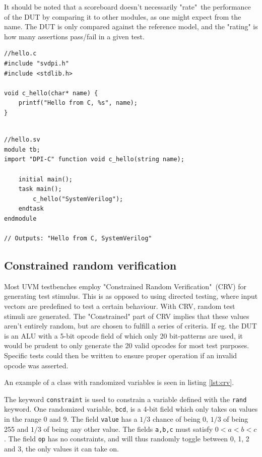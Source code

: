 \documentclass[conference]{IEEEtran}
\newcommand{\SV}{SystemVerilog\xspace}
\begin{document}
It should be noted that a scoreboard doesn't necessarily "rate"\, the performance of the DUT by comparing it to other modules, as one might expect from the name. The DUT is only compared against the reference model, and the "rating" is how many assertions pass/fail in a given test.

\begin{listing}[htbp]
\begin{verbatim}
//hello.c
#include "svdpi.h"
#include <stdlib.h>

void c_hello(char* name) {
	printf("Hello from C, %s", name);
}
\end{verbatim}
\begin{verbatim}

//hello.sv
module tb;
import "DPI-C" function void c_hello(string name);

	initial main();
	task main();
		c_hello("SystemVerilog");
	endtask
endmodule

// Outputs: "Hello from C, SystemVerilog"
\end{verbatim}
\caption{Short example showing how to use the \SV DPI to execute C-code from within \SV.}
\label{lst:dpi}
\end{listing}

\subsection{Constrained random verification}

Most UVM testbenches employ "Constrained Random Verification"\, (CRV) for generating test stimulus. This is as opposed to using directed testing, where input vectors are predefined to test a certain behaviour. With CRV, random test stimuli are generated. The "Constrained" part of CRV implies that these values aren't entirely random, but are chosen to fulfill a series of criteria. If eg. the DUT is an ALU with a 5-bit opcode field of which only 20 bit-patterns are used, it would be prudent to only generate the 20 valid opcodes for most test purposes. Specific tests could then be written to ensure proper operation if an invalid opcode was asserted.

An example of a class with randomized variables is seen in listing \ref{lst:crv}. 

The keyword \texttt{constraint} is used to constrain a variable defined with the \texttt{rand} keyword.
One randomized variable, \texttt{bcd}, is a 4-bit field which only takes on values in the range 0 and 9. 
The field \texttt{value} has a $1/3$ chance of being 0, $1/3$ of being 255 and $1/3$ of being any other value. 
The fields \texttt{a,b,c} must satisfy $0<a<b<c$. 
The field \texttt{op} has no constraints, and will thus randomly toggle between  0, 1, 2 and 3, the only values it can take on.
\end{document}
